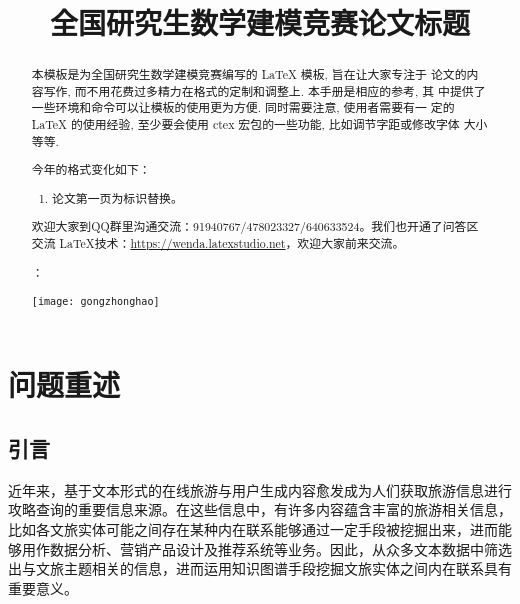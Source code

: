 \documentclass[bwprint]{gmcmthesis}
\title{全国研究生数学建模竞赛论文标题}
\begin{document}
 \maketitle

\begin{abstract}
本模板是为全国研究生数学建模竞赛编写的 \LaTeX{} 模板, 旨在让大家专注于
论文的内容写作, 而不用花费过多精力在格式的定制和调整上. 本手册是相应的参考, 其
中提供了一些环境和命令可以让模板的使用更为方便. 同时需要注意, 使用者需要有一
定的 \LaTeX{} 的使用经验, 至少要会使用 ctex 宏包的一些功能, 比如调节字距或修改字体
大小等等.


 \begin{mdframed} [%
	roundcorner=5pt,
	linecolor=gray!50,
	outerlinewidth=0.5pt,
	middlelinewidth=0.3pt, backgroundcolor=gray!2,
innertopmargin=\topskip, frametitle={2020年格式变化说明},
frametitlefont= \bfseries,frametitlerule=true,frametitlealignment =\raggedright\noindent,
frametitlerulewidth=.5pt, frametitlebackgroundcolor=gray!2,]
今年的格式变化如下：
\begin{enumerate}
\item 论文第一页为标识替换。

\end{enumerate}

\end{mdframed}



欢迎大家到QQ群里沟通交流：91940767/478023327/640633524。我们也开通了问答区交流 \LaTeX{}技术：\url{https://wenda.latexstudio.net}，欢迎大家前来交流。


：

\centerline{\texttt{[image: gongzhonghao]}}


\end{abstract}

\pagestyle{plain}


\section{问题重述}

\subsection{引言}

近年来，基于文本形式的在线旅游与用户生成内容愈发成为人们获取旅游信息进行攻略查询的重要信息来源。在这些信息中，有许多内容蕴含丰富的旅游相关信息，比如各文旅实体可能之间存在某种内在联系能够通过一定手段被挖掘出来，进而能够用作数据分析、营销产品设计及推荐系统等业务。因此，从众多文本数据中筛选出与文旅主题相关的信息，进而运用知识图谱手段挖掘文旅实体之间内在联系具有重要意义。
\end{document}
